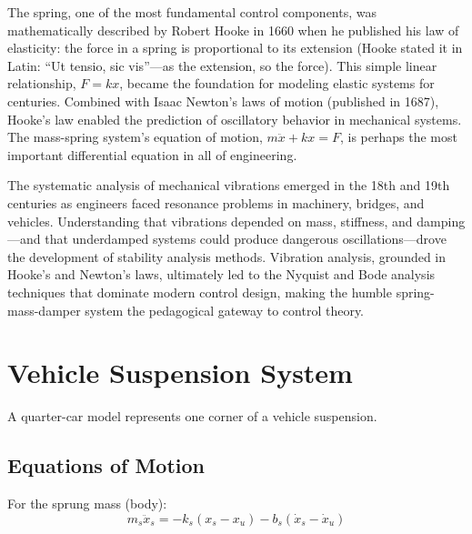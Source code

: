 \begin{historicalbox}[title=Historical Context: Hooke's Law, Newton's Mechanics, and Vibration Analysis]
The spring, one of the most fundamental control components, was mathematically described by Robert Hooke in 1660 when he published his law of elasticity: the force in a spring is proportional to its extension (Hooke stated it in Latin: ``Ut tensio, sic vis''---as the extension, so the force). This simple linear relationship, $F = kx$, became the foundation for modeling elastic systems for centuries. Combined with Isaac Newton's laws of motion (published in 1687), Hooke's law enabled the prediction of oscillatory behavior in mechanical systems. The mass-spring system's equation of motion, $m\ddot{x} + kx = F$, is perhaps the most important differential equation in all of engineering.

The systematic analysis of mechanical vibrations emerged in the 18th and 19th centuries as engineers faced resonance problems in machinery, bridges, and vehicles. Understanding that vibrations depended on mass, stiffness, and damping---and that underdamped systems could produce dangerous oscillations---drove the development of stability analysis methods. Vibration analysis, grounded in Hooke's and Newton's laws, ultimately led to the Nyquist and Bode analysis techniques that dominate modern control design, making the humble spring-mass-damper system the pedagogical gateway to control theory.
\end{historicalbox}

\section{Vehicle Suspension System}
\label{sec:vehicle_suspension}

A quarter-car model represents one corner of a vehicle suspension.



\subsection{Equations of Motion}

For the sprung mass (body):
\begin{equation}
m_s\ddot{x}_s = -k_s(x_s - x_u) - b_s(\dot{x}_s - \dot{x}_u)
\end{equation}

